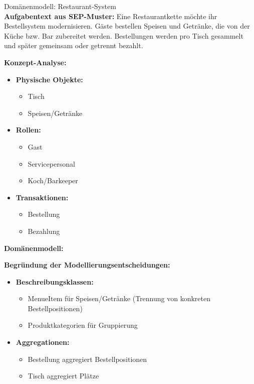 \begin{example2}{Domänenmodell: Restaurant-System}\\
\textbf{Aufgabentext aus SEP-Muster:}
Eine Restaurantkette möchte ihr Bestellsystem modernisieren. Gäste bestellen Speisen und Getränke, die von der Küche bzw. Bar zubereitet werden. Bestellungen werden pro Tisch gesammelt und später gemeinsam oder getrennt bezahlt.

\textbf{Konzept-Analyse:}
\begin{itemize}
    \item \textbf{Physische Objekte:}
    \begin{itemize}
        \item Tisch
        \item Speisen/Getränke
    \end{itemize}
    
    \item \textbf{Rollen:}
    \begin{itemize}
        \item Gast
        \item Servicepersonal
        \item Koch/Barkeeper
    \end{itemize}
    
    \item \textbf{Transaktionen:}
    \begin{itemize}
        \item Bestellung
        \item Bezahlung
    \end{itemize}
\end{itemize}

\textbf{Domänenmodell:}


\textbf{Begründung der Modellierungsentscheidungen:}
\begin{itemize}
    \item \textbf{Beschreibungsklassen:}
    \begin{itemize}
        \item MenueItem für Speisen/Getränke (Trennung von konkreten Bestellpositionen)
        \item Produktkategorien für Gruppierung
    \end{itemize}
    
    \item \textbf{Aggregationen:}
    \begin{itemize}
        \item Bestellung aggregiert Bestellpositionen
        \item Tisch aggregiert Plätze
    \end{itemize}
    

\end{itemize}
\end{example2}
